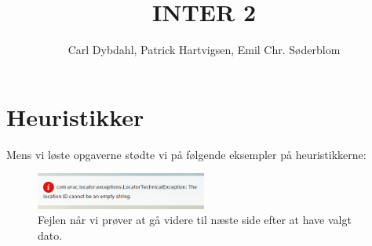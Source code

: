 \documentclass[a4paper]{article}
\title{INTER 2}
\author{Carl Dybdahl, Patrick Hartvigsen, Emil Chr. Søderblom}
\begin{document}
\maketitle

\section{Heuristikker}

Mens vi løste opgaverne stødte vi på følgende eksempler på heuristikkerne:

\begin{figure}[!ht]
\centering
\includegraphics[width=0.5\textwidth]{error0.png}
\caption{Fejlen når vi prøver at gå videre til næste side efter at have valgt dato.}
\label{error-next}
\end{figure}
\end{document}
